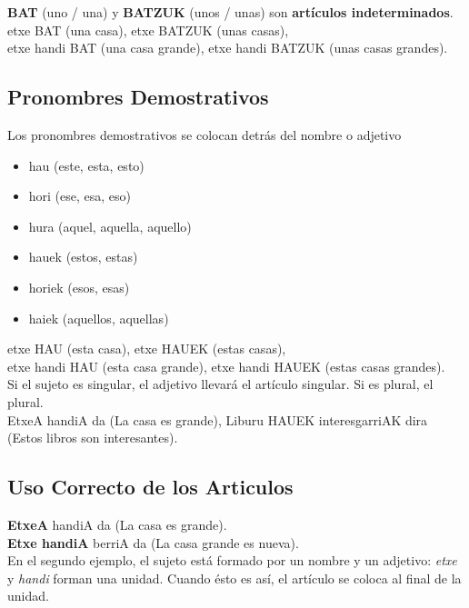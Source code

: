 \documentclass[11pt, a4paper]{article}
\begin{document}
\textbf{BAT} (uno / una) y \textbf{BATZUK} (unos / unas) son \textbf{artículos indeterminados}.\\
etxe BAT (una casa), etxe BATZUK (unas casas),\\ etxe handi BAT (una casa grande), etxe handi BATZUK (unas casas grandes).

\subsection{Pronombres Demostrativos}
Los pronombres demostrativos se colocan detrás del nombre o adjetivo
\begin{itemize}
\item hau (este, esta, esto)
\item hori (ese, esa, eso)
\item hura (aquel, aquella, aquello)
\item hauek (estos, estas)
\item horiek (esos, esas)
\item haiek (aquellos, aquellas)
\end{itemize}
etxe HAU (esta casa), etxe HAUEK (estas casas),\\ etxe handi HAU (esta casa grande), etxe handi HAUEK (estas casas grandes).\\

Si el sujeto es singular, el adjetivo llevará el artículo singular. Si es plural, el plural.\\
EtxeA handiA da (La casa es grande), Liburu HAUEK interesgarriAK dira (Estos libros son interesantes).

\subsection{Uso Correcto de los Articulos}
\textbf{EtxeA} handiA da (La casa es grande).\\
\textbf{Etxe handiA} berriA da (La casa grande es nueva).\\
En el segundo ejemplo, el sujeto está formado por un nombre y un adjetivo: \textit{etxe} y \textit{handi} forman una unidad. Cuando ésto es así, el artículo se coloca al final de la unidad.
\end{document}
